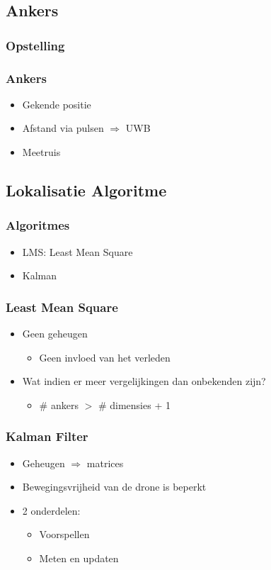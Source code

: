 \documentclass{beamer}
\begin{document}
\subsection{Ankers}
  \begin{frame}
    \frametitle{Opstelling}
  \end{frame}
  \begin{frame}
    \frametitle{Ankers}
    \begin{itemize}
      \item Gekende positie
      \item Afstand via pulsen $\Rightarrow$ UWB
      \item Meetruis
    \end{itemize}
  \end{frame}
\subsection{Lokalisatie Algoritme}
  \begin{frame}
    \frametitle{Algoritmes}
    \begin{itemize}
      \item LMS: Least Mean Square
      \item Kalman 
    \end{itemize}
  \end{frame}
  \begin{frame}
    \frametitle{Least Mean Square}
    \begin{itemize}
      \item Geen geheugen
        \begin{itemize}
          \item Geen invloed van het verleden
        \end{itemize}
      \item Wat indien er meer vergelijkingen dan onbekenden zijn?
        \begin{itemize}
          \item \# ankers $>$ \# dimensies + 1
        \end{itemize}
    \end{itemize}
  \end{frame}
  \begin{frame}
    \frametitle{Kalman Filter}
    \begin{itemize}
      \item Geheugen $\Rightarrow$ matrices
      \item Bewegingsvrijheid van de drone is beperkt
      \item 2 onderdelen:
        \begin{itemize}
          \item Voorspellen
          \item Meten en updaten
        \end{itemize}
    \end{itemize}
  \end{frame}
\end{document}
